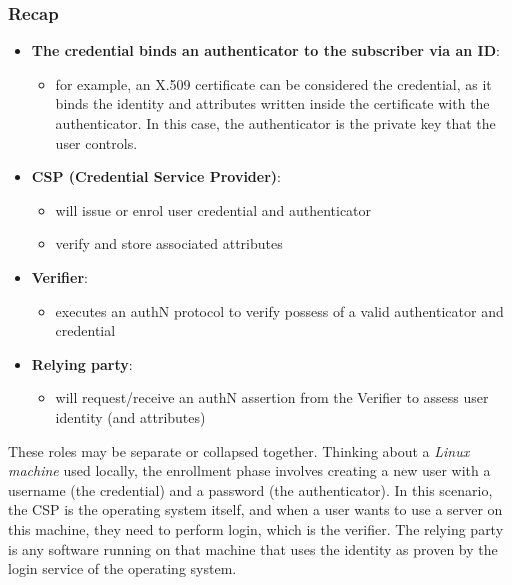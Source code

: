 \subsubsection*{Recap}
\begin{itemize}
  \item \textbf{The credential binds an authenticator to the subscriber via an ID}:
        \begin{itemize}
          \item for example, an X.509 certificate can be considered the credential, as it binds the identity and attributes written inside the certificate with the authenticator. In this case, the authenticator is the private key that the user controls.
        \end{itemize}
  \item \textbf{CSP (Credential Service Provider)}:
        \begin{itemize}
          \item will issue or enrol user credential and authenticator
          \item verify and store associated attributes
        \end{itemize}
  \item \textbf{Verifier}:
        \begin{itemize}
          \item executes an authN protocol to verify possess of a valid
                authenticator and credential
        \end{itemize}
  \item \textbf{Relying party}:
        \begin{itemize}
          \item will request/receive an authN assertion from the Verifier to
                assess user identity (and attributes)
        \end{itemize}
\end{itemize}


These roles may be separate or collapsed together.
Thinking about a \emph{Linux machine} used locally, the enrollment phase involves creating a new user with a username (the credential) and a password (the authenticator). In this scenario, the CSP is the operating system itself, and when a user wants to use a server on this machine, they need to perform login, which is the verifier. The relying party is any software running on that machine that uses the identity as proven by the login service of the operating system.



